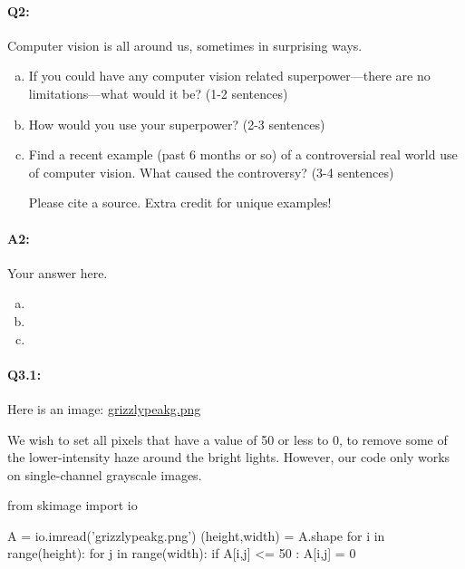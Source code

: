 \documentclass[11pt]{article}
\begin{document}
\paragraph{Q2:}
Computer vision is all around us, sometimes in surprising ways.
\begin{enumerate}[(a)]

\item
If you could have any computer vision related superpower---there are no limitations---what would it be? (1-2 sentences)

\item
How would you use your superpower? (2-3 sentences)

\item Find a recent example (past 6 months or so) of a controversial real world use of computer vision. What caused the controversy? (3-4 sentences)

Please cite a source. Extra credit for unique examples!
\end{enumerate}

\paragraph{A2:} Your answer here.

\begin{enumerate}[(a)]

\item

\item

\item

\end{enumerate}



\pagebreak
\paragraph{Q3.1:} Here is an image: \href{grizzlypeakg.png}{grizzlypeakg.png}

We wish to set all pixels that have a value of 50 or less to 0, to remove some of the lower-intensity haze around the bright lights. However, our code only works on single-channel grayscale images.

\begin{python}
from skimage import io

A = io.imread('grizzlypeakg.png')
(height,width) = A.shape
for i in range(height):
    for j in range(width):
        if A[i,j] <= 50 :
            A[i,j] = 0
\end{python}
\end{document}
